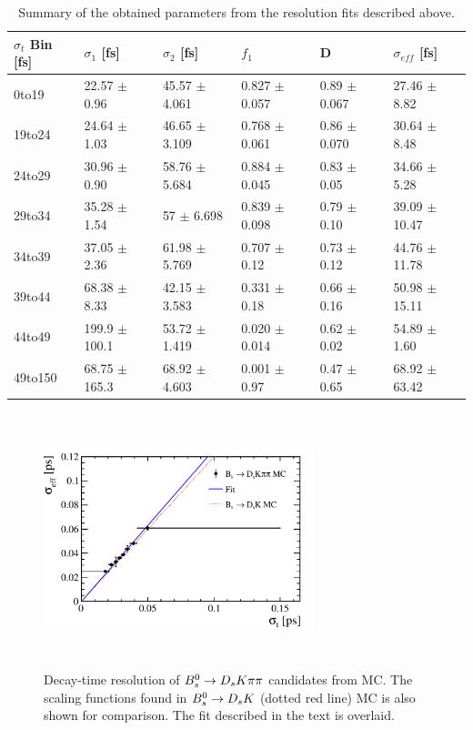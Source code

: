 \begin{table}[h]
\centering
 \begin{tabular}{l || l l l | l l}
$\sigma_{t}$ Bin [fs] & $\sigma_{1}$ [fs] & $\sigma_{2}$ [fs] & $f_{1}$ & D & $\sigma_{eff}$ [fs] \\
\hline
0to19 & 22.57 $\pm$ 0.96 & 45.57 $\pm$ 4.061 & 0.827 $\pm$ 0.057 & 0.89 $\pm$ 0.067 & 27.46 $\pm$ 8.82 \\
19to24 & 24.64 $\pm$ 1.03 & 46.65 $\pm$ 3.109 & 0.768 $\pm$ 0.061 & 0.86 $\pm$ 0.070 & 30.64 $\pm$ 8.48 \\
24to29 & 30.96 $\pm$ 0.90 & 58.76 $\pm$ 5.684 & 0.884 $\pm$ 0.045 & 0.83 $\pm$ 0.05 & 34.66 $\pm$ 5.28 \\
29to34 & 35.28 $\pm$ 1.54 & 57 $\pm$ 6.698 & 0.839 $\pm$ 0.098 & 0.79 $\pm$ 0.10 & 39.09 $\pm$ 10.47 \\
34to39 & 37.05 $\pm$ 2.36 & 61.98 $\pm$ 5.769 & 0.707 $\pm$ 0.12 & 0.73 $\pm$ 0.12 & 44.76 $\pm$ 11.78 \\
39to44 & 68.38 $\pm$ 8.33 & 42.15 $\pm$ 3.583 & 0.331 $\pm$ 0.18 & 0.66 $\pm$ 0.16 & 50.98 $\pm$ 15.11 \\
44to49 & 199.9 $\pm$ 100.1 & 53.72 $\pm$ 1.419 & 0.020 $\pm$ 0.014 & 0.62 $\pm$ 0.02 & 54.89 $\pm$ 1.60 \\
49to150 & 68.75 $\pm$ 165.3 & 68.92 $\pm$ 4.603 & 0.001 $\pm$ 0.97 & 0.47 $\pm$ 0.65 & 68.92 $\pm$ 63.42 \\
\hline
\end{tabular}
\caption{Summary of the obtained parameters from the resolution fits described above.}
\label{table:ResoParams}
\end{table}


\begin{figure}[h]
\includegraphics[height=7.4cm,width=0.7\textwidth]{figs/Resolution/ProperTimeReso_MC.pdf}
\caption{Decay-time resolution of ${{B}^0_{s}}\rightarrow{\ensuremath{{D}_{s}}}{\ensuremath{K}}{\ensuremath{\pi}}{\ensuremath{\pi}}$ candidates from MC. 
The scaling functions found in ${{B}^0_{s}}\rightarrow{\ensuremath{{D}_{s}}}{\ensuremath{K}}$ (dotted red line) MC is also shown for comparison. The fit described in the text is overlaid.}
\label{fig:ResoFit_compared}
\end{figure}



